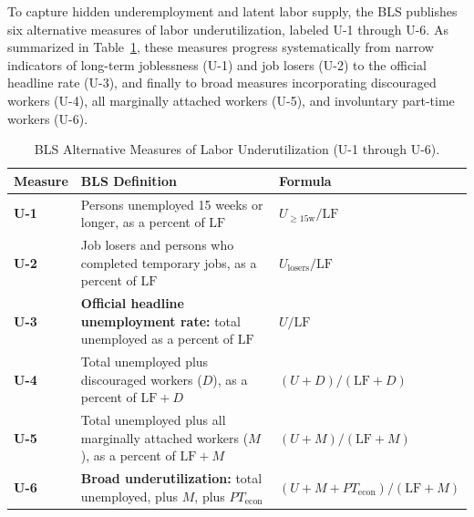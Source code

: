 \documentclass[11pt, a4paper]{article}
\begin{document}
To capture hidden underemployment and latent labor supply, the BLS publishes six alternative measures of labor underutilization, labeled U-1 through U-6. As summarized in Table~\ref{tab:bls_u1_u6}, these measures progress systematically from narrow indicators of long-term joblessness (U-1) and job losers (U-2) to the official headline rate (U-3), and finally to broad measures incorporating discouraged workers (U-4), all marginally attached workers (U-5), and involuntary part-time workers (U-6).

\begin{table}[htbp]
\centering
\caption{BLS Alternative Measures of Labor Underutilization (U-1 through U-6).}
\label{tab:bls_u1_u6}
\small
\begin{tabularx}{\linewidth}{@{} l X l @{}}
\toprule
\textbf{Measure} & \textbf{BLS Definition} & \textbf{Formula} \\
\midrule
\textbf{U-1} & Persons unemployed 15 weeks or longer, as a percent of $\text{LF}$ & $U_{\ge 15\text{w}} / \text{LF}$ \\
\textbf{U-2} & Job losers and persons who completed temporary jobs, as a percent of $\text{LF}$ & $U_{\text{losers}} / \text{LF}$ \\
\textbf{U-3} & \textbf{Official headline unemployment rate:} total unemployed as a percent of $\text{LF}$ & $U / \text{LF}$ \\
\textbf{U-4} & Total unemployed plus discouraged workers ($D$), as a percent of $\text{LF} + D$ & $(U + D) / (\text{LF} + D)$ \\
\textbf{U-5} & Total unemployed plus all marginally attached workers ($M$), as a percent of $\text{LF} + M$ & $(U + M) / (\text{LF} + M)$ \\
\textbf{U-6} & \textbf{Broad underutilization:} total unemployed, plus $M$, plus $PT_{\text{econ}}$ & $(U + M + PT_{\text{econ}}) / (\text{LF} + M)$ \\
\bottomrule
\end{tabularx}
\end{table}
\end{document}
